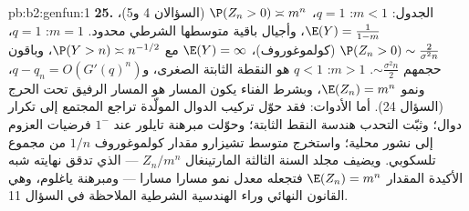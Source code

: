 \begin{solution}{pb:b2:genfun:1}
\textbf{25.} الجدول: $m < 1$: $q = 1$، $\P(Z_n > 0)
\asymp m^n$ (السؤالان 4 و5)،
$\E(Y) = \frac1{1-m}$، وأجيال باقية متوسطها الشرطي محدود. $m = 1$: $q = 1$، $\P(Z_n > 0) \sim \frac2{\sigma^2n}$
(كولموغوروف)، $\E(Y) = \infty$ مع $\P(Y > n) \asymp n^{-1/2}$، وباقون حجمهم $\sim \frac{\sigma^2n}2$. $m > 1$:
$q < 1$ هو النقطة الثابتة الصغرى، و$q - q_n = O(G'(q)^n)$، ونمو $\E(Z_n) = m^n$، وبشرط
الفناء يكون المسار هو المسار الرفيق تحت الحرج (السؤال 24). أما
الأدوات: فقد حوّل تركيب الدوال المولّدة تراجع المجتمع إلى تكرار
دوال؛ وثبّت التحدب هندسة النقط الثابتة؛ وحوّلت مبرهنة تايلور عند
$1^-$ فرضيات العزوم إلى نشور محلية؛ واستخرج متوسط تشيزارو مقدار
كولموغوروف $1/n$ من مجموع تلسكوبي. ويضيف مجلد السنة الثالثة
المارتينغال $Z_n/
m^n$ --- الذي تدقق نهايته شبه الأكيدة المقدار $\E(Z_n) = m^n$
فتجعله معدل نمو مسارا مسارا --- ومبرهنة ياغلوم، وهي القانون النهائي
وراء الهندسية الشرطية الملاحظة في السؤال 11.
\end{solution}
